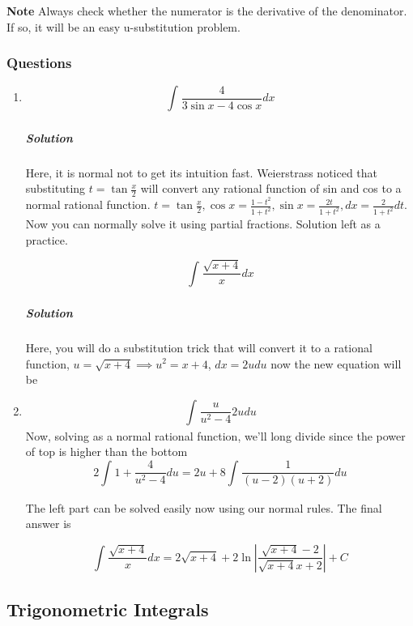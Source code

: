 \documentclass{article}
\begin{document}
	\textbf{Note} Always check whether the numerator is the derivative of the denominator. If so, it will be an easy u-substitution problem. 

	\newpage
	\subsubsection{Questions}

	\begin{enumerate}[1.]
		\item  \[\int^{}_{} \frac{4}{ 3\sin{ x }- 4\cos{ x }  }  dx  \]

			\subparagraph{Solution}
			Here, it is normal not to get its intuition fast. Weierstrass noticed that substituting $ t = \tan{ \frac{x}{2} }  $ will convert any rational function of sin and cos to  a normal rational function. 
			$ t = \tan{ \frac{x}{2} }, \cos{ x } = \frac{ 1-t^2 }{ 1+t^2 }, \sin{ x } = \frac{2t}{1+t^2}, dx = \frac{2}{1+t^2}dt  $. 
			Now you can normally solve it using partial fractions. Solution left as a practice. 

			\[
				\int^{}_{} \frac{\sqrt{x+4}}{x} dx
			\]
			\subparagraph{Solution}
			Here, you will do a substitution trick that will convert it to a rational function, $ u = \sqrt{ x+4 } \implies u^2 = x+4 $, $ dx = 2 u du $  now the new equation will be
		\item 	\[ 	\int^{}_{} \frac{u}{u^2-4} 2 u du \]
			Now, solving as a normal rational function, we'll long divide since the power of top is higher than the bottom
			\[
				2\int^{}_{} 1+ \frac{4}{u^2-4} du  = 2u + 8 \int^{}_{} \frac{ 1 }{  (u-2)(u+2)} du  
			\]

			The left part can be solved easily now using our normal rules. The final answer is

			\[
				\int^{}_{} \frac{\sqrt{x+4}}{x} dx = 2 \sqrt{ x+4} +2 \ln | \frac{ \sqrt{ x+4 } -2 }{ \sqrt{ x+4 } x+2 }| + C 
			\]

	\end{enumerate}




	\newpage

	\subsection{Trigonometric Integrals}
\end{document}
